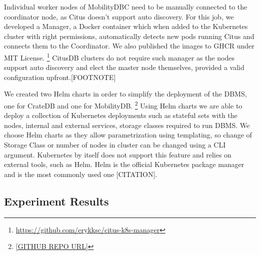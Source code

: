 Individual worker nodes of MobilityDBC need to be manually connected to the coordinator node, as Citus doesn't support auto discovery.
For this job, we developed a Manager, a Docker container which when added to the Kubernetes cluster with right permissions, automatically detects new pods running Citus and connects them to the Coordinator.
We also published the images to GHCR under MIT License.
\footnote{\url{https://github.com/erykksc/citus-k8s-manager}}
CitusDB clusters do not require such manager as the nodes support auto discovery and elect the master node themselves, provided a valid configuration upfront.[FOOTNOTE]

We created two Helm charts in order to simplify the deployment of the DBMS, one for CrateDB and one for MobilityDB.
\footnote{\url{[GITHUB REPO URL]}}
Using Helm charts we are able to deploy a collection of Kubernetes deployments such as stateful sets with the nodes, internal and external services, storage classes required to run DBMS.
We choose Helm charts as they allow parametrization using templating, so change of Storage Class or number of nodes in cluster can be changed using a CLI argument.
Kubernetes by itself does not support this feature and relies on external tools, such as Helm.
Helm is the official Kubernetes package manager and is the most commonly used one [CITATION].

\subsection{Experiment Results}
\label{sec:experiment-results}




